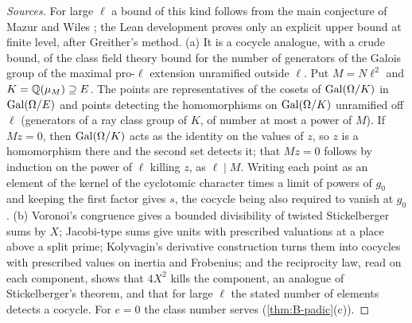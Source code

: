 \begin{proof}[Sources]
For large $\ell$ a bound of this kind follows from the main conjecture of Mazur and Wiles \cite{Wiles1990}; the Lean development proves only an explicit upper bound at finite level, after Greither's method. (a) It is a cocycle analogue, with a crude bound, of the class field theory bound for the number of generators of the Galois group of the maximal pro-$\ell$
extension unramified outside $\ell$. Put $M=N\ell^2$ and $K=\mathbb{Q}(\mu_M)\supseteq E$. The points are representatives of the cosets of $\operatorname{Gal}(\Omega/K)$ in $\operatorname{Gal}(\Omega/E)$ and points detecting the homomorphisms on $\operatorname{Gal}(\Omega/K)$ unramified off
$\ell$ (generators of a ray class group of $K$, of number at most a power of $M$). If $Mz=0$, then $\operatorname{Gal}(\Omega/K)$ acts as the identity on the values of $z$, so $z$ is a homomorphism there and the second set detects it; that $Mz=0$ follows by
induction on the power of $\ell$ killing $z$, as $\ell\mid M$. Writing each point as an element of the kernel of the cyclotomic character times a limit of powers of $g_0$ and keeping the first factor gives $s$, the cocycle being
also required to vanish at $g_0$. (b)
Voronoi's congruence gives a bounded divisibility of twisted Stickelberger sums by $X$; Jacobi-type sums give units with prescribed valuations at a place above a split prime; Kolyvagin's derivative construction turns them into
cocycles with prescribed values on inertia and Frobenius; and the reciprocity law, read on each component, shows that $4X^2$ kills the component, an analogue of Stickelberger's theorem, and that for large $\ell$ the stated number of
elements detects a cocycle. For $e=0$ the class number serves (\cref{thm:B-padic}(c)).
\end{proof}

